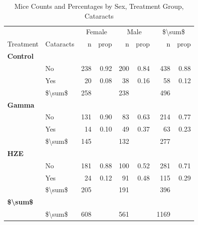 \documentclass[
]{article}
\begin{document}
\begin{table}[!h]

\caption{\label{tab:table}Mice Counts and Percentages by Sex, Treatment Group, Cataracts}
\centering
\begin{tabular}[t]{l|l|r|r|r|r|r|r}
\hline
\multicolumn{2}{c|}{ } & \multicolumn{2}{c|}{Female} & \multicolumn{2}{c|}{Male} & \multicolumn{2}{c}{\$\textbackslash{}sum\$} \\
\cline{3-4} \cline{5-6} \cline{7-8}
Treatment & Cataracts & n & prop & n & prop & n & prop\\
\hline
\multicolumn{8}{l}{\textbf{Control}}\\
\hline
\hspace{1em} & No & 238 & 0.92 & 200 & 0.84 & 438 & 0.88\\
\hline
\hspace{1em} & Yes & 20 & 0.08 & 38 & 0.16 & 58 & 0.12\\
\hline
\hspace{1em} & \$\textbackslash{}sum\$ & 258 &  & 238 &  & 496 & \\
\hline
\multicolumn{8}{l}{\textbf{Gamma}}\\
\hline
\hspace{1em} & No & 131 & 0.90 & 83 & 0.63 & 214 & 0.77\\
\hline
\hspace{1em} & Yes & 14 & 0.10 & 49 & 0.37 & 63 & 0.23\\
\hline
\hspace{1em} & \$\textbackslash{}sum\$ & 145 &  & 132 &  & 277 & \\
\hline
\multicolumn{8}{l}{\textbf{HZE}}\\
\hline
\hspace{1em} & No & 181 & 0.88 & 100 & 0.52 & 281 & 0.71\\
\hline
\hspace{1em} & Yes & 24 & 0.12 & 91 & 0.48 & 115 & 0.29\\
\hline
\hspace{1em} & \$\textbackslash{}sum\$ & 205 &  & 191 &  & 396 & \\
\hline
\multicolumn{8}{l}{\textbf{\$\textbackslash{}sum\$}}\\
\hline
\hspace{1em} & \$\textbackslash{}sum\$ & 608 &  & 561 &  & 1169 & \\
\hline
\end{tabular}
\end{table}
\end{document}

